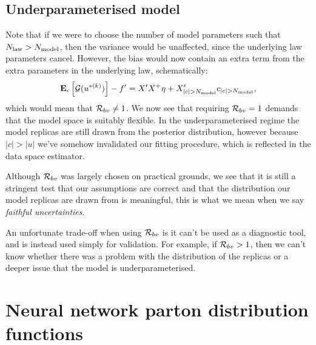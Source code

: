 \subsection{Underparameterised model}

Note that if we were to choose the
number of model parameters such that $N_{\rm law} > N_{\rm model}$, then the variance
would be unaffected, since the underlying law parameters cancel. However, the
bias would now contain an extra term from the extra parameters in the
underlying law, schematically:
\begin{equation}
    \begin{split}
        \mathbf{E}_{\epsilon}\left[ \mathcal{G}(u^{* (k)}) \right] - f^\prime =
        X^\prime X^+ \eta + X^\prime_{|c| > N_{\rm model}} c_{|c| > N_{\rm model}},
    \end{split}
\end{equation}
which would mean that $\mathcal{R}_{bv} \neq 1$. We now see that requiring
$\mathcal{R}_{bv} = 1$ demands that the model space is suitably flexible. In the
underparameterised regime the model replicas are still drawn from the posterior
distribution, however because $\vert c \vert > \vert u \vert$
we've somehow invalidated our fitting procedure, which is reflected in the
data space estimator.

Although $\mathcal{R}_{bv}$ was largely chosen on practical
grounds, we see that it is still a stringent test that our assumptions are
correct and that the distribution our model replicas are drawn from is meaningful,
this is what we mean when we say {\em faithful uncertainties}.

An unfortunate
trade-off when using $\mathcal{R}_{bv}$ is it can't be used as a diagnostic
tool, and is instead used simply for validation. For example, if
$\mathcal{R}_{bv} > 1$, then we
can't know whether there was a problem with the distribution of the replicas
or a deeper issue that the model is underparameterised.

\section{Neural network parton distribution functions}

